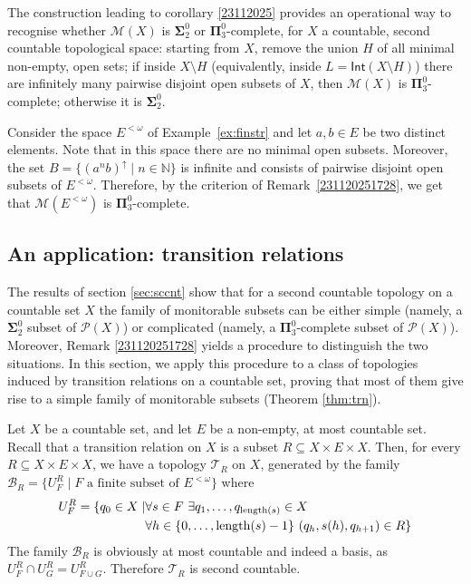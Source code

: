 \documentclass{lmcs}
\newcommand{\N}{\mathbb N}
\newcommand{\bsigma}{\boldsymbol\Sigma}
\newcommand{\bpi}{\boldsymbol\Pi}
\newcommand{\lnh}{{\rm{length}}}
\newcommand{\Int}[1]{\mathsf{Int}(#1)}
\begin{document}
\begin{rem} \label{231120251728}
The construction leading to corollary \ref{23112025} provides an operational way to recognise whether $ \mathcal M (X)$ is $ \bsigma^0_2$ or $ \bpi^0_3$-complete, for $X$ a countable, second countable topological space: starting from $X$, remove the union $H$ of all minimal non-empty, open sets; if inside $X\setminus H$ (equivalently, inside $L= \Int{X\setminus H} $) there are infinitely many pairwise disjoint open subsets of $X$, then $ \mathcal M (X)$ is $ \bpi^0_3$-complete; otherwise it is $ \bsigma^0_2$.
\end{rem}

\begin{exa}
Consider the space $E^{{<}\omega}$ of Example~\ref{ex:finstr} and let $a,b\in E$ be two distinct elements. 
Note that in this space there are no minimal open subsets. 
Moreover, the set 
$B = \{ (a^nb)^{\uparrow }\mid n \in \N \}$ 
is infinite and consists of pairwise disjoint open subsets of $E^{{<}\omega}$. 
Therefore, by the criterion of Remark~\ref{231120251728}, we get that $\mathcal{M}(E^{{<}\omega})$ is $\bpi^0_3$-complete. 
\end{exa}

\subsection{An application: transition relations}
 \label{sec:trn}
The results of section \ref{sec:sccnt} show that for a second countable topology on a countable set $X$ the family of monitorable subsets can be either simple (namely, a $ \bsigma^0_2$ subset of $ \mathcal P (X)$) or complicated (namely, a $ \bpi^0_3$-complete subset of $ \mathcal P (X)$).
Moreover, Remark \ref{231120251728} yields a procedure to distinguish the two situations.
% 
In this section, we apply this procedure to a class of topologies induced by transition relations on a countable set, 
proving that most of them give rise to a simple family of monitorable subsets 
(Theorem \ref{thm:trn}). 

Let $X$ be a countable set, and let $E$ be a non-empty, at most countable set.
Recall that a transition relation on $X$ is a subset $R \subseteq X \times E \times X$. 
Then, for every $R\subseteq X\times E\times X$, we have a topology $ \mathcal T_R$ on $X$, generated by the family $ \mathcal B_R=\{ U_F^R\mid F \text{ a finite subset of } E^{<\omega }\} $ where
\[\begin{split} 
U_F^R = \{ q_0\in X\mid &\forall s\in F\ \exists q_1,\ldots ,q_{ \lnh (s)}\in X \\
  &\forall h\in\{ 0,\ldots , \lnh (s)-1\}\ (q_h,s(h),q_{h+1})\in R \}
\end{split}\] 
The family $ \mathcal B_R$ is obviously at most countable and indeed a basis, as $U_F^R\cap U_G^R=U_{F\cup G}^R$.
Therefore $ \mathcal T_R$ is second countable.
\end{document}
